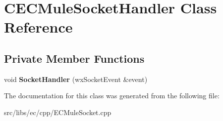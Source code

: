 \section{CECMuleSocketHandler Class Reference}
\label{classCECMuleSocketHandler}
\subsection*{Private Member Functions}
\begin{DoxyCompactItemize}
\item 
void {\bfseries SocketHandler} (wxSocketEvent \&event)\label{classCECMuleSocketHandler_a5ce281dc8efd850be938bbd4505af34d}

\end{DoxyCompactItemize}


The documentation for this class was generated from the following file:\begin{DoxyCompactItemize}
\item 
src/libs/ec/cpp/ECMuleSocket.cpp\end{DoxyCompactItemize}
